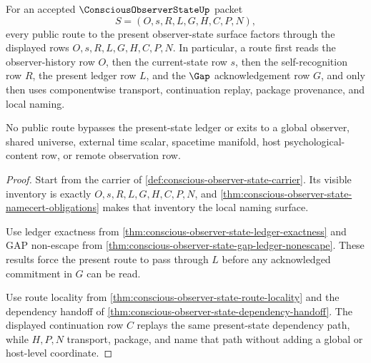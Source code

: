 \begin{theorem}
\label{thm:conscious-observer-state-present-route-exhaustion}
For an accepted $\ConsciousObserverStateUp$ packet
$$
S=(O,s,R,L,G,H,C,P,N),
$$
every public route to the present observer-state surface factors through the displayed rows $O,s,R,L,G,H,C,P,N$. In particular, a route first reads the observer-history row $O$, then the current-state row $s$, then the self-recognition row $R$, the present ledger row $L$, and the $\Gap$ acknowledgement row $G$, and only then uses componentwise transport, continuation replay, package provenance, and local naming.

No public route bypasses the present-state ledger or exits to a global observer, shared universe, external time scalar, spacetime manifold, host psychological-content row, or remote observation row.
\end{theorem}
\begin{proof}
Start from the carrier of \autoref{def:conscious-observer-state-carrier}. Its visible inventory is exactly $O,s,R,L,G,H,C,P,N$, and \autoref{thm:conscious-observer-state-namecert-obligations} makes that inventory the local naming surface.

Use ledger exactness from \autoref{thm:conscious-observer-state-ledger-exactness} and GAP non-escape from \autoref{thm:conscious-observer-state-gap-ledger-nonescape}. These results force the present route to pass through $L$ before any acknowledged commitment in $G$ can be read.

Use route locality from \autoref{thm:conscious-observer-state-route-locality} and the dependency handoff of \autoref{thm:conscious-observer-state-dependency-handoff}. The displayed continuation row $C$ replays the same present-state dependency path, while $H,P,N$ transport, package, and name that path without adding a global or host-level coordinate.
\end{proof}

